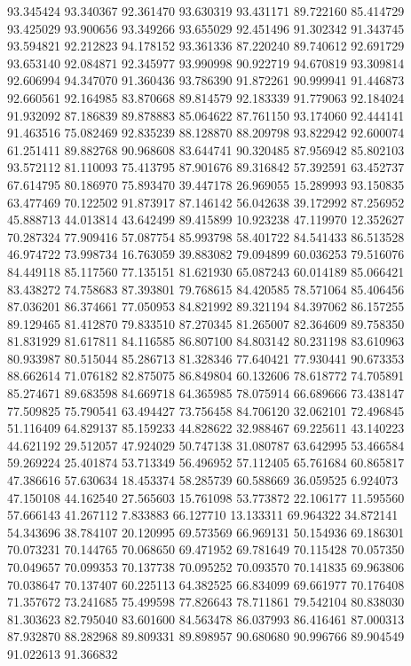 93.345424
93.340367
92.361470
93.630319
93.431171
89.722160
85.414729
93.425029
93.900656
93.349266
93.655029
92.451496
91.302342
91.343745
93.594821
92.212823
94.178152
93.361336
87.220240
89.740612
92.691729
93.653140
92.084871
92.345977
93.990998
90.922719
94.670819
93.309814
92.606994
94.347070
91.360436
93.786390
91.872261
90.999941
91.446873
92.660561
92.164985
83.870668
89.814579
92.183339
91.779063
92.184024
91.932092
87.186839
89.878883
85.064622
87.761150
93.174060
92.444141
91.463516
75.082469
92.835239
88.128870
88.209798
93.822942
92.600074
61.251411
89.882768
90.968608
83.644741
90.320485
87.956942
85.802103
93.572112
81.110093
75.413795
87.901676
89.316842
57.392591
63.452737
67.614795
80.186970
75.893470
39.447178
26.969055
15.289993
93.150835
63.477469
70.122502
91.873917
87.146142
56.042638
39.172992
87.256952
45.888713
44.013814
43.642499
89.415899
10.923238
47.119970
12.352627
70.287324
77.909416
57.087754
85.993798
58.401722
84.541433
86.513528
46.974722
73.998734
16.763059
39.883082
79.094899
60.036253
79.516076
84.449118
85.117560
77.135151
81.621930
65.087243
60.014189
85.066421
83.438272
74.758683
87.393801
79.768615
84.420585
78.571064
85.406456
87.036201
86.374661
77.050953
84.821992
89.321194
84.397062
86.157255
89.129465
81.412870
79.833510
87.270345
81.265007
82.364609
89.758350
81.831929
81.617811
84.116585
86.807100
84.803142
80.231198
83.610963
80.933987
80.515044
85.286713
81.328346
77.640421
77.930441
90.673353
88.662614
71.076182
82.875075
86.849804
60.132606
78.618772
74.705891
85.274671
89.683598
84.669718
64.365985
78.075914
66.689666
73.438147
77.509825
75.790541
63.494427
73.756458
84.706120
32.062101
72.496845
51.116409
64.829137
85.159233
44.828622
32.988467
69.225611
43.140223
44.621192
29.512057
47.924029
50.747138
31.080787
63.642995
53.466584
59.269224
25.401874
53.713349
56.496952
57.112405
65.761684
60.865817
47.386616
57.630634
18.453374
58.285739
60.588669
36.059525
6.924073
47.150108
44.162540
27.565603
15.761098
53.773872
22.106177
11.595560
57.666143
41.267112
7.833883
66.127710
13.133311
69.964322
34.872141
54.343696
38.784107
20.120995
69.573569
66.969131
50.154936
69.186301
70.073231
70.144765
70.068650
69.471952
69.781649
70.115428
70.057350
70.049657
70.099353
70.137738
70.095252
70.093570
70.141835
69.963806
70.038647
70.137407
60.225113
64.382525
66.834099
69.661977
70.176408
71.357672
73.241685
75.499598
77.826643
78.711861
79.542104
80.838030
81.303623
82.795040
83.601600
84.563478
86.037993
86.416461
87.000313
87.932870
88.282968
89.809331
89.898957
90.680680
90.996766
89.904549
91.022613
91.366832
